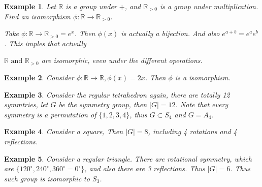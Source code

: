\documentclass{article}
\theoremstyle{MyNonumberplain}
\theoremstyle{break}
\newcommand{\p}{\phi}
\newcommand{\infixand}{\text{ and }}
\theoremstyle{break}
\newtheorem{example}{Example}[section]
\theoremstyle{break}
\theoremstyle{definition}
\theoremstyle{break}
\begin{document}
\begin{expbox}
    \begin{example}
        Let $\mathbb{R}$ is a group under $+$, and $\mathbb{R}_{> 0}$ is a group under
        multiplication. Find an isomorphism $\phi : \mathbb{R} \rightarrow
        \mathbb{R}_{> 0}$.
        
            \begin{ansbox}
                Take $\phi : \mathbb{R} \rightarrow \mathbb{R}_{> 0} = e^x$. Then $\phi (x)$
                is actually a bijection. And also $e^{a + b} = e^a e^b$. This imples that
                actually

                $\mathbb{R} \infixand \mathbb{R}_{> 0}$ are isomorphic, even under the
                different operations. 
            \end{ansbox}

    \end{example}
\end{expbox}

\begin{expbox}
    \begin{example}
        Consider $\p : \mathbb{R} \rightarrow \mathbb{R}, \p (x) = 2 x$. Then $\p$ is a isomorphism.
    \end{example}
\end{expbox}

\begin{expbox}
    \begin{example}
        Consider the regular tetrahedron again, there are totally 12 symmtries, let
        $G$ be the symmetry group, then $| G | = 12$. Note that every symmetry is a
        permutation of $\{ 1, 2, 3, 4 \}$, thus $G \subset S_4$ and $G = A_4$.        
    \end{example}
\end{expbox}

\begin{expbox}
    \begin{example}
       
        Consider a square, Then $| G | = 8$, including 4 rotations and 4
        reflections. 
  
    \end{example}
\end{expbox}

\begin{expbox}
    \begin{example}
        Consider a regular triangle. There are rotational symmetry, which are $\{
        120^{\circ}, 240^{\circ}, 360^{\circ} = 0^{\circ} \}$, and also there are 3
        reflections. Thus $| G | = 6$. Thus such group is isomorphic to $S_3$.    
    \end{example}
\end{expbox}
\end{document}
